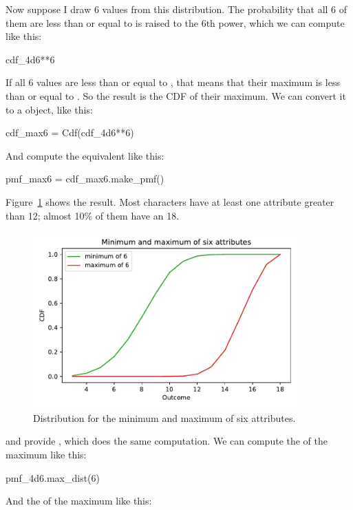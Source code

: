 \documentclass[12pt]{book}
\theoremstyle{exercise}
\begin{document}
Now suppose I draw 6 values from this distribution.
The probability that all 6 of them are less than or equal to  is  raised to the 6th power, which we can compute like this:

\begin{code}
cdf_4d6**6
\end{code}

If all 6 values are less than or equal to , that means that their maximum is less than or equal to .
So the result is the CDF of their maximum.
We can convert it to a  object, like this:

\begin{code}
cdf_max6 = Cdf(cdf_4d6**6)
\end{code}

And compute the equivalent  like this:

\begin{code}
pmf_max6 = cdf_max6.make_pmf()
\end{code}

Figure~\ref{fig06-03} shows the result.  
Most characters have at least one attribute greater than 12; almost 10\% of them have an 18.

\begin{figure}
\centerline{\includegraphics[width=4in]{figs/fig06-03.pdf}}
\caption{Distribution for the minimum and maximum of six attributes.}
\label{fig06-03}
\end{figure}

 and  provide , which does the same computation.
We can compute the  of the maximum like this:

\begin{code}
pmf_4d6.max_dist(6)
\end{code}

And the  of the maximum like this:
\end{document}
